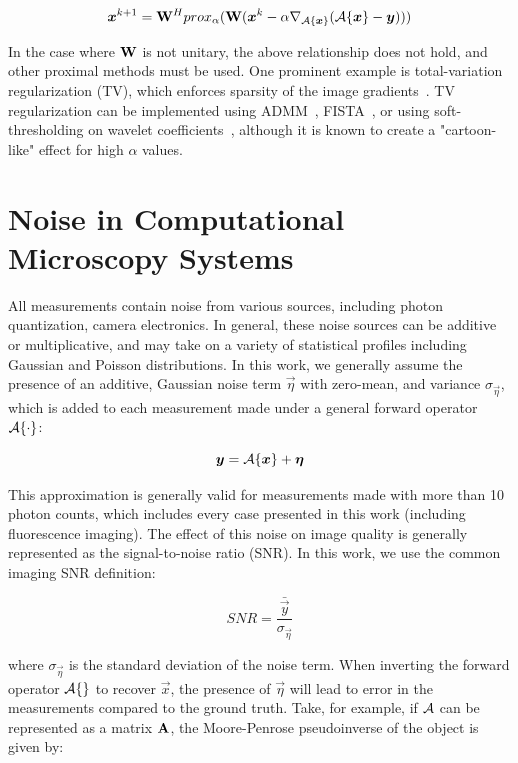\begin{equation}
    \bm{x}^{k+1} = \mathbf{W}^H prox_{\alpha}(\mathbf{W} (\bm{x}^{k} - \alpha \nabla_{\mathcal{A}\{\bm{x}\}} (\mathcal{A}\{\bm{x}\} - \bm{y})))
\end{equation}

In the case where $\mathbf{W}$ is not unitary, the above relationship does not hold, and other proximal methods must be used. One prominent example is total-variation regularization (TV), which enforces sparsity of the image gradients~\cite{rudin1992nonlinear}. TV regularization can be implemented using ADMM~\cite{wahlberg2012admm}, FISTA~\cite{beck2009fast}, or using soft-thresholding on wavelet coefficients~\cite{kamilov2012wavelet}, although it is known to create a "cartoon-like" effect for high $\alpha$ values.

\section{Noise in Computational Microscopy Systems}\label{sec:intro_noise}
All measurements contain noise from various sources, including photon quantization, camera electronics. In general, these noise sources can be additive or multiplicative, and may take on a variety of statistical profiles including Gaussian and Poisson distributions. In this work, we generally assume the presence of an additive, Gaussian noise term $\vec{\eta}$ with zero-mean, and variance $\sigma_{\vec{\eta}}$, which is added to each measurement made under a general forward operator $\mathcal{A}\{\cdot\}$:

\begin{equation}\label{eq:intro_forward_model}
    \bm{y} = \mathcal{A}\{\bm{x}\} + \bm{\eta}
\end{equation}

This approximation is generally valid for measurements made with more than 10 photon counts, which includes every case presented in this work (including fluorescence imaging). The effect of this noise on image quality is generally represented as the signal-to-noise ratio (SNR). In this work, we use the common imaging SNR definition:

\begin{equation}
    \label{eq:intro_snr}
    SNR = \frac{\bar{\vec{y}}}{\sigma_{\vec{\eta}}}
\end{equation}

\noindent where $\sigma_{\vec{\eta}}$ is the standard deviation of the noise term. When inverting the forward operator $\mathcal{A}\{\}$ to recover $\vec{x}$, the presence of $\vec{\eta}$ will lead to error in the measurements compared to the ground truth. Take, for example, if $\mathcal{A}$ can be represented as a matrix $\mathbf{A}$, the Moore-Penrose pseudoinverse of the object is given by:

